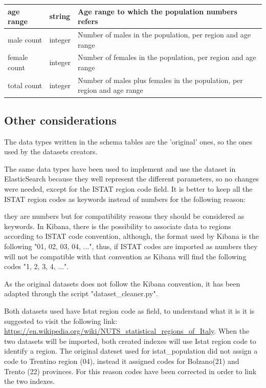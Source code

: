 \documentclass{article}
\begin{document}
\newpage
\begin{center}
\begin{tabular}{ |m{4cm}|m{2cm}|m{4.5cm}|}
\hline
  age range & string & Age range to which the population numbers refers\\
    \hline
  male count & integer & Number of males in the population, per region and age range\\
    \hline

  female count & integer & Number of females in the population, per region and age range\\
    \hline
  total count & integer & Number of males plus females in the population, per region and age range\\
    \hline
  \end{tabular}
\end{center}
\hfill\break

\subsection{Other considerations}
The data types written in the schema tables are the 'original' ones, so the ones used by the datasets creators.

The same data types have been used to implement and use the dataset in ElasticSearch because they well represent the different parameters, so no changes were needed, except for the ISTAT region code field.
It is better to keep all the ISTAT region codes as keywords instead of numbers for the following reason:

they are numbers but for compatibility reasons they should be considered as keywords. In Kibana, there is the possibility to associate data to regions according to ISTAT code convention, although, the format used by Kibana is the following "01, 02, 03, 04, ...", thus, if ISTAT codes are imported as numbers they will not be compatible with that convention as Kibana will find the following codes "1, 2, 3, 4, ...".

As the original datasets does not follow the Kibana convention, it has been adapted through the script {\selectfont"dataset\_cleaner.py"}.

\hfill\break
Both datasets used have Istat region code as field, to understand what it is it is suggested to visit the following link: \\ \url{https://en.wikipedia.org/wiki/NUTS\_statistical\_regions\_of\_Italy}.
\hfill\break
\hfill\break
When the two datasets will be imported, both created indexes will use Istat region code to identify a region. The original dateset used for istat\_population did not assign a code to Trentino region (04), instead it assigned codes for Bolzano(21) and Trento (22) provinces. For this reason codes have been corrected in order to link the two indexes.
\end{document}
